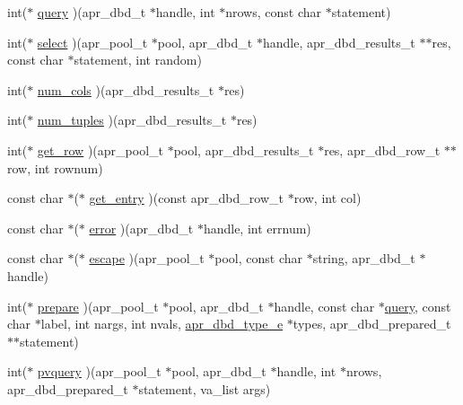 \begin{DoxyCompactItemize}
\item 
int($\ast$ \hyperlink{structapr__dbd__driver__t_a87de2303419493ddab5b0c1a298c9837}{query} )(apr\-\_\-dbd\-\_\-t $\ast$handle, int $\ast$nrows, const char $\ast$statement)
\item 
int($\ast$ \hyperlink{structapr__dbd__driver__t_adc4a483ffb93e88532034a25600ab1e4}{select} )(apr\-\_\-pool\-\_\-t $\ast$pool, apr\-\_\-dbd\-\_\-t $\ast$handle, apr\-\_\-dbd\-\_\-results\-\_\-t $\ast$$\ast$res, const char $\ast$statement, int random)
\item 
int($\ast$ \hyperlink{structapr__dbd__driver__t_ab71099e0877a99b7743f70b927f44353}{num\-\_\-cols} )(apr\-\_\-dbd\-\_\-results\-\_\-t $\ast$res)
\item 
int($\ast$ \hyperlink{structapr__dbd__driver__t_a8e307da83a358c169706ea9154f58f22}{num\-\_\-tuples} )(apr\-\_\-dbd\-\_\-results\-\_\-t $\ast$res)
\item 
int($\ast$ \hyperlink{structapr__dbd__driver__t_a93b4e127622c1f118da3855c518941cc}{get\-\_\-row} )(apr\-\_\-pool\-\_\-t $\ast$pool, apr\-\_\-dbd\-\_\-results\-\_\-t $\ast$res, apr\-\_\-dbd\-\_\-row\-\_\-t $\ast$$\ast$row, int rownum)
\item 
const char $\ast$($\ast$ \hyperlink{structapr__dbd__driver__t_a21742ca8a1b183de2a93ca04d030843f}{get\-\_\-entry} )(const apr\-\_\-dbd\-\_\-row\-\_\-t $\ast$row, int col)
\item 
const char $\ast$($\ast$ \hyperlink{structapr__dbd__driver__t_a0f43ae627fef47fb6eb2d5a6bca07c65}{error} )(apr\-\_\-dbd\-\_\-t $\ast$handle, int errnum)
\item 
const char $\ast$($\ast$ \hyperlink{structapr__dbd__driver__t_aee7333b952c8e7fca206d10b5cf673fc}{escape} )(apr\-\_\-pool\-\_\-t $\ast$pool, const char $\ast$string, apr\-\_\-dbd\-\_\-t $\ast$handle)
\item 
int($\ast$ \hyperlink{structapr__dbd__driver__t_ab8c46d23cfa5340ae9cac02c4c12cf67}{prepare} )(apr\-\_\-pool\-\_\-t $\ast$pool, apr\-\_\-dbd\-\_\-t $\ast$handle, const char $\ast$\hyperlink{structapr__dbd__driver__t_a87de2303419493ddab5b0c1a298c9837}{query}, const char $\ast$label, int nargs, int nvals, \hyperlink{group___a_p_r___util___d_b_d_ga19608fa5d518a5121bee23daacc5c230}{apr\-\_\-dbd\-\_\-type\-\_\-e} $\ast$types, apr\-\_\-dbd\-\_\-prepared\-\_\-t $\ast$$\ast$statement)
\item 
int($\ast$ \hyperlink{structapr__dbd__driver__t_ac57585d1c31c541770a149b7a7aa1eda}{pvquery} )(apr\-\_\-pool\-\_\-t $\ast$pool, apr\-\_\-dbd\-\_\-t $\ast$handle, int $\ast$nrows, apr\-\_\-dbd\-\_\-prepared\-\_\-t $\ast$statement, va\-\_\-list args)
$$
\end{DoxyCompactItemize}
